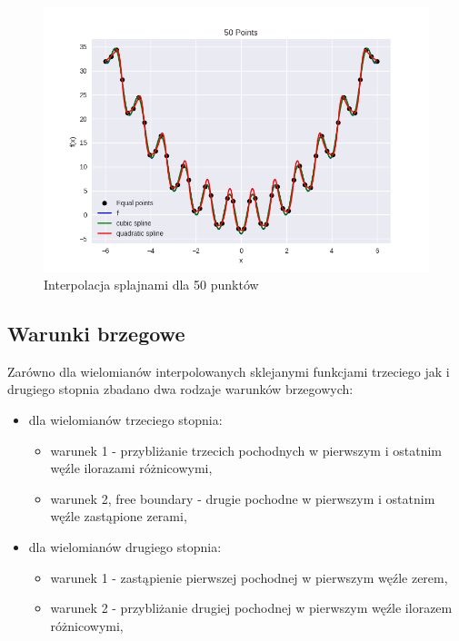 \documentclass{article}
\begin{document}
\begin{figure}[H]
    \centering
    \includegraphics[width=\textwidth]{img/spline_50.png}
    \caption{Interpolacja splajnami dla 50 punktów}
\end{figure}

\subsection{Warunki brzegowe}
Zarówno dla wielomianów interpolowanych sklejanymi funkcjami trzeciego jak i drugiego stopnia zbadano dwa rodzaje warunków brzegowych:
\begin{itemize}
    \item
    dla wielomianów trzeciego stopnia:
    \begin{itemize}
        \item
        warunek 1 - przybliżanie trzecich pochodnych w pierwszym i ostatnim węźle ilorazami różnicowymi,
        \item
        warunek 2, free boundary - drugie pochodne w pierwszym i ostatnim węźle zastąpione zerami,
    \end{itemize}
    \item
    dla wielomianów drugiego stopnia:
    \begin{itemize}
        \item
        warunek 1 - zastąpienie pierwszej pochodnej w pierwszym węźle zerem,
        \item
        warunek 2 - przybliżanie drugiej pochodnej w pierwszym węźle ilorazem różnicowymi,
    \end{itemize}
\end{itemize}
\end{document}

